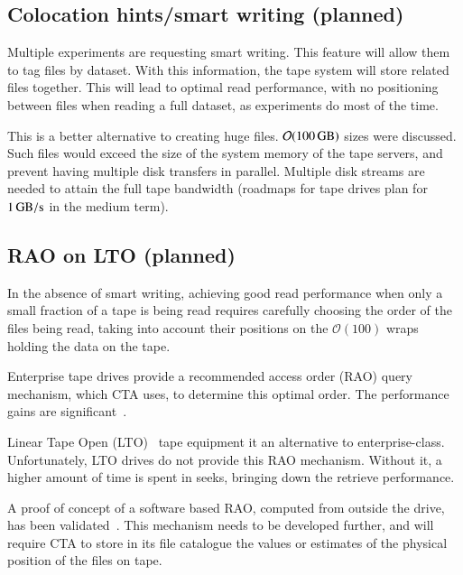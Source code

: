 \documentclass{webofc}
\begin{document}

\subsection{Colocation hints/smart writing (planned)}
Multiple experiments are requesting smart writing. This feature will
allow them to tag files by dataset. With this information, the tape system will store related files
together. This will lead to optimal read performance, with no positioning between
files when reading a full dataset, as experiments do most of the time.

This is a better alternative to creating huge files. $\mathcal{O}(\SI{100}{\giga\byte})$
sizes were discussed. Such files would exceed the size of the system memory of the tape
servers, and prevent having multiple disk transfers in parallel. Multiple disk streams are needed to attain the full 
tape bandwidth (roadmaps for tape drives plan for $\SI{1}{\giga\byte\per\second}$ in the medium term).

\subsection{RAO on LTO (planned)}
In the absence of smart writing, achieving good read performance when only a small fraction of a tape is being read requires
carefully choosing the order of the files being read, taking into account their positions
on the $\mathcal{O}(100)$ wraps holding the data on the tape.

Enterprise tape drives provide a recommended access order (RAO) query mechanism, which CTA uses, to
determine this optimal order. The performance gains are significant~\cite{cristina_msc_thesis}.

Linear Tape Open (LTO)~\cite{LTO} tape equipment it an alternative to enterprise-class. 
Unfortunately, LTO drives do not provide this RAO mechanism. Without it, a higher amount of time is spent in seeks,
bringing down the retrieve performance.

A proof of concept of a software based RAO, computed from outside the drive, has been validated~\cite{German_LTO_RAO}.
This mechanism needs to be developed further, and will require CTA to store in its file catalogue the values or estimates of
the physical position of the files on tape.
\end{document}
